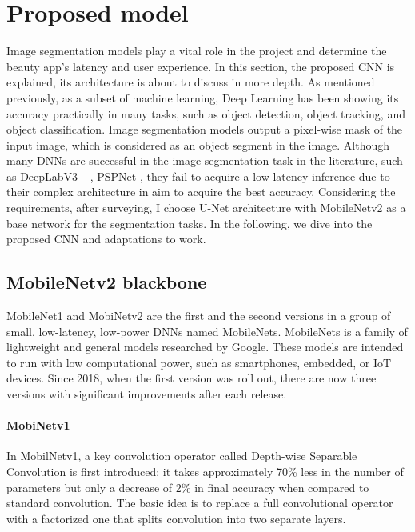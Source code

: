 \section{Proposed model} \label{sec:model}

Image segmentation models play a vital role in the project and determine the beauty app's latency and user experience. In this section, the proposed CNN is explained, its architecture is about to discuss in more depth. As mentioned previously, as a subset of machine learning, Deep Learning has been showing its accuracy practically in many tasks, such as object detection, object tracking, and object classification. Image segmentation models output a pixel-wise mask of the input image, which is considered as an object segment in the image. Although many DNNs are successful in the image segmentation task in the literature, such as DeepLabV3+ \cite{deeplabv3plus}, PSPNet \cite{pspnet}, they fail to acquire a low latency inference due to their complex architecture in aim to acquire the best accuracy. Considering the requirements, after surveying, I choose U-Net \cite{unet} architecture with MobileNetv2 \cite{mobilenetv2} as a base network for the segmentation tasks. In the following, we dive into the proposed CNN and adaptations to work.
 
 \subsection{MobileNetv2 blackbone}
 MobileNet1 and MobiNetv2 are the first and the second versions in a group of small, low-latency, low-power DNNs named MobileNets. MobileNets is a family of lightweight and general models researched by Google. These models are intended to run with low computational power, such as smartphones, embedded, or IoT devices. Since 2018, when the first version was roll out, there are now three versions with significant improvements after each release. \par
 
 \paragraph{MobiNetv1}
 In MobilNetv1, a key convolution operator called Depth-wise Separable Convolution is first introduced; it takes approximately 70\% less in the number of parameters but only a decrease of 2\% in final accuracy when compared to standard convolution. The basic idea is to replace a full convolutional operator with a factorized one that splits convolution into two separate layers. \par
 
